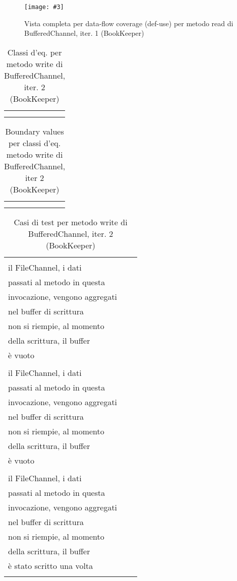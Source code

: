 \documentclass[10pt, a4paper]{article}
\newcommand{\Intmaketable}[4]{
	\begin{longtable}{#3}
	#4
	\caption{#2}
	\label{#1}
	\end{longtable}
}
\newcommand{\Intceqtable}[3]{
	\Intmaketable{#1}{#2}{|l|l|}{
	\hline
	\thead{Parametro formale} & \thead{Classi d'equivalenza} \\
	\hline
	\hline
	#3
	\hline}
}
\newcommand{\Intbvtable}[3]{
	\Intmaketable{#1}{#2}{|l|l|l|}{
	\hline
	\thead{Parametro formale} & \thead{Classe d'equivalenza} & \thead{Boundary value}\\
	\hline
	\hline
	#3
	\hline}
}
\newcommand{\Inttestctable}[3]{
	\Intmaketable{#1}{#2}{|l|l|l|}{
	\hline
	\thead{Input} & \thead{Esito atteso} & \thead{Motivazione}\\
	\hline
	\hline
	#3
	\hline}
}
\newcommand{\Intceqcaption}[4]{Classi d'eq. per metodo #1 di #2, iter. #3 (#4)}
\newcommand{\Intbvcaption}[4]{Boundary values per classi d'eq. metodo #1 di #2, iter #3 (#4)}
\newcommand{\Inttestccaption}[4]{Casi di test per metodo #1 di #2, iter. #3 (#4)}
\newcommand{\gettablelabel}[5]{table:#1:#2:#3:iter#4:proj#5}
\newcommand{\ceqtable}[5]{
	\Intceqtable{\gettablelabel{ceq}{#1}{#2}{#3}{#4}}
		{\Intceqcaption{#1}{#2}{#3}{#4}}
		{#5}
}
\newcommand{\bvtable}[5]{
	\Intbvtable{\gettablelabel{bv}{#1}{#2}{#3}{#4}}
		{\Intbvcaption{#1}{#2}{#3}{#4}}
		{#5}
}
\newcommand{\testctable}[5]{
	\Inttestctable{\gettablelabel{testc}{#1}{#2}{#3}{#4}}
		{\Inttestccaption{#1}{#2}{#3}{#4}}
		{#5}
}
\newcommand{\getpicturelabel}[1]{picture:#1}
\newcommand{\makepicture}[4]{
	\begin{figure}[H]
	\centering
	\texttt{[image: \#3]}
	\caption{#4}
	\label{\getpicturelabel{#3}}
	\end{figure}
}
\newcommand{\alldfcovcaption}[4]{Vista completa per data-flow coverage (def-use) per metodo #1 di #2, iter. #3 (#4)}
\newcommand{\tcell}{\makecell[tl]}
\newcommand{\newtrow}{\\ \hline}
\def\bookkeeper{BookKeeper}
\newcommand{\ceq}[1]{\{#1\}}
\begin{document}
	\makepicture{10cm}{12cm}{bk/dataflow-read-BufferedChannel-1}
				{\alldfcovcaption{read}{BufferedChannel}{1}{\bookkeeper}}
				
	
	\ceqtable{write}{BufferedChannel}{2}{\bookkeeper}{
			\tcell{src} & \tcell{
				\ceq{buffer a lunghezza $\ge 0$}}
		\newtrow
	}
				
	\bvtable{write}{BufferedChannel}{2}{\bookkeeper}{
			\tcell{src} & \tcell{\ceq{buffer a lunghezza $\ge 0$}} & \tcell{ByteBuf("")}
		\newtrow
	}
	
	\testctable{write}{BufferedChannel}{2}{\bookkeeper}{
			\tcell{ByteBuf("")} & 
			\tcell{
				Nessuna interazione con\\
				il FileChannel, i dati\\
				passati al metodo in questa\\
				invocazione, vengono aggregati\\
				nel buffer di scrittura} & 	
			\tcell{
				Il buffer di scrittura\\
				non si riempie, al momento\\
				della scrittura, il buffer\\
				è vuoto}
		\newtrow
			\tcell{ByteBuf("random data")} &
			\tcell{
				Nessuna interazione con\\
				il FileChannel, i dati\\
				passati al metodo in questa\\
				invocazione, vengono aggregati\\
				nel buffer di scrittura} &
			\tcell{
				Il buffer di scrittura\\
				non si riempie, al momento\\
				della scrittura, il buffer\\
				è vuoto}
		\newtrow
			\tcell{ByteBuf("more random data")} &
			\tcell{
				Nessuna interazione con\\
				il FileChannel, i dati\\
				passati al metodo in questa\\
				invocazione, vengono aggregati\\
				nel buffer di scrittura} &
			\tcell{
				Il buffer di scrittura\\
				non si riempie, al momento\\
				della scrittura, il buffer\\
				è stato scritto una volta}
		\newtrow
			\tcell{ByteBuf("datadatadata")} &
			\tcell{
}}
\end{document}
